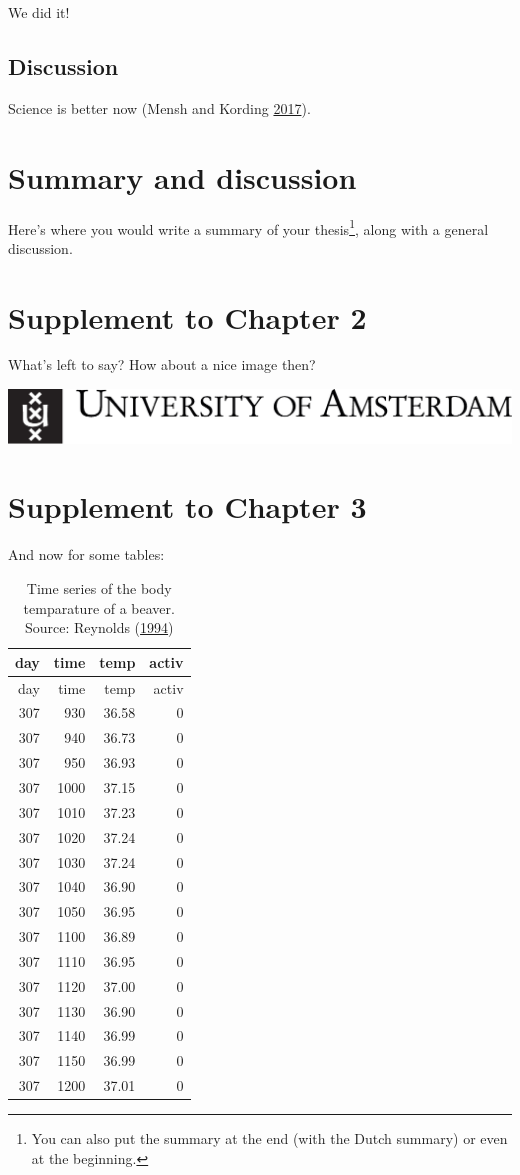 \documentclass[12pt,english,a4paper,oneside,]{book} %
\let\rmarkdownfootnote\footnote%
\def\footnote{\protect\rmarkdownfootnote}
\theoremstyle{definition}
\theoremstyle{definition}
\theoremstyle{definition}
\theoremstyle{remark}
\begin{document}
We did it!

\hypertarget{discussion3}{%
\section{Discussion}\label{discussion3}}

Science is better now (Mensh and Kording \protect\hyperlink{ref-Mensh2017}{2017}).

\hypertarget{summary-and-discussion}{%
\chapter{Summary and discussion}\label{summary-and-discussion}}

Here's where you would write a summary of your thesis\footnote{You can also put the summary at the end (with the Dutch summary) or even at the beginning.}, along with a general discussion.

\hypertarget{appendix-appendix}{%
\appendix}


\hypertarget{supplement-to-chapter-2}{%
\chapter{Supplement to Chapter 2}\label{supplement-to-chapter-2}}

What's left to say? How about a nice image then?

\includegraphics{figures/uvalogo_regular_p_en.pdf}

\hypertarget{supplement-to-chapter-3}{%
\chapter{Supplement to Chapter 3}\label{supplement-to-chapter-3}}

And now for some tables:

\begin{longtable}[]{@{}rrrr@{}}
\caption{\label{tab:beaver-2} Time series of the body temparature of a beaver. Source: Reynolds (\protect\hyperlink{ref-Reynolds1994}{1994})}\tabularnewline
\toprule
day & time & temp & activ\tabularnewline
\midrule
\endfirsthead
\toprule
day & time & temp & activ\tabularnewline
\midrule
\endhead
307 & 930 & 36.58 & 0\tabularnewline
307 & 940 & 36.73 & 0\tabularnewline
307 & 950 & 36.93 & 0\tabularnewline
307 & 1000 & 37.15 & 0\tabularnewline
307 & 1010 & 37.23 & 0\tabularnewline
307 & 1020 & 37.24 & 0\tabularnewline
307 & 1030 & 37.24 & 0\tabularnewline
307 & 1040 & 36.90 & 0\tabularnewline
307 & 1050 & 36.95 & 0\tabularnewline
307 & 1100 & 36.89 & 0\tabularnewline
307 & 1110 & 36.95 & 0\tabularnewline
307 & 1120 & 37.00 & 0\tabularnewline
307 & 1130 & 36.90 & 0\tabularnewline
307 & 1140 & 36.99 & 0\tabularnewline
307 & 1150 & 36.99 & 0\tabularnewline
307 & 1200 & 37.01 & 0\tabularnewline
\bottomrule
\end{longtable}
\end{document}
